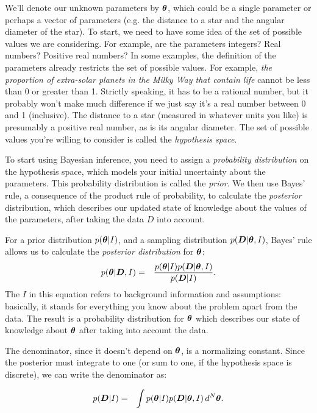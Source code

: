 We'll denote our unknown parameters by $\boldsymbol{\theta}$, which could be a single
parameter or perhaps a vector of parameters (e.g. the distance to a star
and the angular diameter of the star). To start, we
need to have some idea of the set of possible values we are considering. For
example, are the parameters integers? Real numbers? Positive real numbers?
In some examples, the definition of the parameters already restricts the set
of possible values. For example, {\it the proportion of extra-solar planets in
the Milky Way that contain life} cannot be less than 0 or greater than 1.
Strictly speaking, it has to be a rational number, but it probably won't make
much difference if we just say it's a real number between 0 and 1 (inclusive).
The distance to a star (measured in whatever units you like) is presumably a
positive real number, as is its angular diameter.
The set of possible values you're willing to consider is called the
{\it hypothesis space}.

To start using Bayesian inference, you need to assign a {\it probability
distribution} on the hypothesis space, which models your initial uncertainty
about the parameters. This probability distribution is called the {\it prior}.
We then use Bayes' rule, a consequence of the product rule of probability,
to calculate the {\it posterior} distribution, which describes our updated
state of knowledge about the values of the parameters, after taking the data
$D$ into account.

For a prior distribution $p(\boldsymbol{\theta} | I)$, and a sampling
distribution $p(\boldsymbol{D} | \boldsymbol{\theta}, I)$, Bayes' rule allows us to calculate
the {\it posterior distribution} for $\boldsymbol{\theta}$:
\begin{eqnarray}
p(\boldsymbol{\theta} | \boldsymbol{D}, I) &=& \frac{p(\boldsymbol{\theta} | I)p(\boldsymbol{D} | \boldsymbol{\theta}, I)}{p(\boldsymbol{D} | I)}.
\end{eqnarray}
The $I$ in this equation refers to background information and assumptions:
basically, it stands for everything you know about the problem apart from the
data. The result is a probability distribution for $\boldsymbol{\theta}$ which describes
our state of knowledge about $\boldsymbol{\theta}$ after taking into account the data.

The denominator, since it doesn't depend on $\boldsymbol{\theta}$, is a normalizing
constant. Since the posterior must integrate to one (or sum to one, if the
hypothesis space is discrete), we can write the denominator as:

\begin{eqnarray}
p(\boldsymbol{D} | I) &=& \int p(\boldsymbol{\theta} | I)p(\boldsymbol{D} | \boldsymbol{\theta}, I) \, d^N \boldsymbol{\theta}.
\end{eqnarray}


